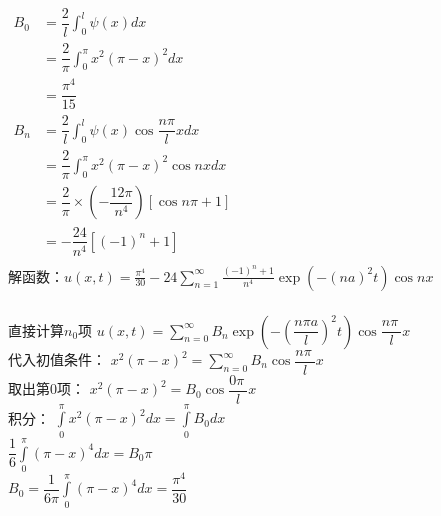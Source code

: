 \begin{frame}
	\frametitle{}
	$\displaystyle \begin{array}{lllllllll}
		B_0&=\dfrac{2}{l} \int_{0}^{l} \psi(x) dx   \\
		&= \dfrac{2}{\pi} \int_{0}^{\pi}  x^2 (\pi-x)^2 dx  \\
		&=\dfrac{\pi ^4}{15}\\
		B_n&=\dfrac{2}{l} \int_{0}^{l} \psi(x) \cos \dfrac{n\pi}{l} xdx \\
		&= \dfrac{2}{\pi} \int_{0}^{\pi}   x^2 (\pi-x)^2   \cos nx dx \\
		&= \dfrac{2}{\pi} \times (-\dfrac{12 \pi}{n^4})  [\cos n\pi +1 ] \\
		&= -\dfrac{24}{n^4} [ (-1)^n +1 ] \\
	\end{array}$ \\ 
	解函数：$\displaystyle  u(x,t) =  \frac{\pi ^4}{30} -24 \sum_{n=1}^{\infty } \frac{(-1)^n +1 }{n^4}  \exp(-(na)^2 t) \cos n x$\\
\end{frame}	

\begin{frame}
	\frametitle{}
	\begin{alertblock}{直接计算$n_0$项}
		$u(x,t)=  \sum\limits_{n=0}^{\infty } B_n  \exp(-(\dfrac{n\pi a}{l})^2 t) \cos \dfrac{n\pi~}{l} x$\\
		代入初值条件： $x^2 (\pi-x)^2=  \sum\limits_{n=0}^{\infty } B_n  \cos \dfrac{n\pi~}{l} x$\\
		取出第0项： $x^2 (\pi-x)^2=  B_0  \cos \dfrac{0\pi~}{l} x $\\
		积分： $\int\limits_{0} ^ \pi  x^2 (\pi-x)^2 dx = \int\limits_{0} ^ \pi   B_0  dx $\\
		\hspace{1cm}  $\dfrac{1}{6}  \int\limits_{0} ^ \pi  (\pi-x)^4 dx = B_0 \pi$\\
		\hspace{1cm}  $B_0 = \dfrac{1}{6\pi}  \int\limits_{0} ^ \pi  (\pi-x)^4 dx = \dfrac{\pi ^4}{30} $
   \end{alertblock}
\end{frame}	

